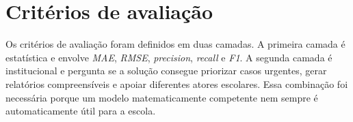 \section{Crit\'erios de avalia\c{c}\~ao}
\label{sec:criterios}

Os crit\'erios de avalia\c{c}\~ao foram definidos em duas camadas. A primeira camada \'e estat\'istica e envolve \textit{MAE}, \textit{RMSE}, \textit{precision}, \textit{recall} e \textit{F1}. A segunda camada \'e institucional e pergunta se a solu\c{c}\~ao consegue priorizar casos urgentes, gerar relat\'orios compreens\'iveis e apoiar diferentes atores escolares. Essa combina\c{c}\~ao foi necess\'aria porque um modelo matematicamente competente nem sempre \'e automaticamente \'util para a escola.

